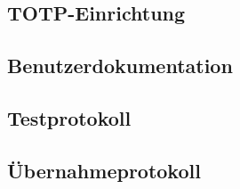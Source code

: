 \subsection{TOTP-Einrichtung}
\label{sec:TOTPConfig}

\subsection{Benutzerdokumentation}
\label{app:Benutzerdokumentation}

\subsection{Testprotokoll}
\label{app:Testprotokoll}

\subsection{Übernahmeprotokoll}
\label{app:Übernahmeprotokoll}
\cleardoublepage

\listoffigures
\cleardoublepage

\listoftables
\cleardoublepage
\clearpage
\renewcommand{\refname}{Literaturverzeichnis}


\cleardoublepage